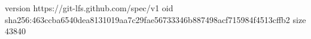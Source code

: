 version https://git-lfs.github.com/spec/v1
oid sha256:463ccba6540dea8131019aa7c29fae56733346b887498acf715984f4513cffb2
size 43840
